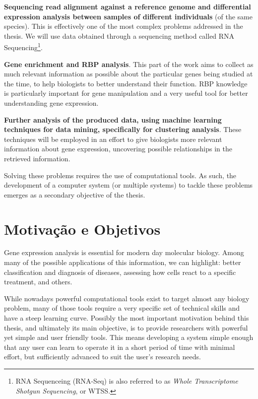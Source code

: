 \documentclass[9pt,a4paper]{extarticle}
\begin{document}
\begin{multicols}{2}
  \textbf{Sequencing read alignment against a reference genome and differential
  expression analysis between samples of different individuals} (of the same
  species). This is effectively one of the most complex problems addressed in
  the thesis. We will use data obtained through a sequencing method called RNA
  Sequencing\footnote{RNA Sequenceing (RNA-Seq) is also referred to as
  \textit{Whole Transcriptome Shotgun Sequencing}, or WTSS.}.

  \textbf{Gene enrichment and RBP analysis}. This part of the work aims to
  collect as much relevant information as possible about the particular genes
  being studied at the time, to help biologists to better understand their
  function. RBP knowledge is particularly important for gene manipulation and a
  very useful tool for better understanding gene expression.

  \textbf{Further analysis of the produced data, using machine learning
  techniques for data mining, specifically for clustering analysis}. These
  techniques will be employed in an effort to give biologists more relevant
  information about gene expression, uncovering possible relationships in the
  retrieved information.

Solving these problems requires the use of computational tools. As such, the
development of a computer system (or multiple systems) to tackle these problems
emerges as a secondary objective of the thesis.

\section{Motivação e Objetivos} \label{sec:motivation}

Gene expression analysis is essential for modern day molecular biology. Among
many of the possible applications of this information, we can highlight: better
classification and diagnosis of diseases, assessing how cells react to a
specific treatment, and others.

While nowadays powerful computational tools exist to target almost any biology
problem, many of those tools require a very specific set of technical skills and
have a steep learning curve. Possibly the most important motivation behind this
thesis, and ultimately its main objective, is to provide researchers with
powerful yet simple and user friendly tools. This means developing a system
simple enough that any user can learn to operate it in a short period of time
with minimal effort, but sufficiently advanced to suit the user's research
needs.


\end{multicols}
\end{document}
